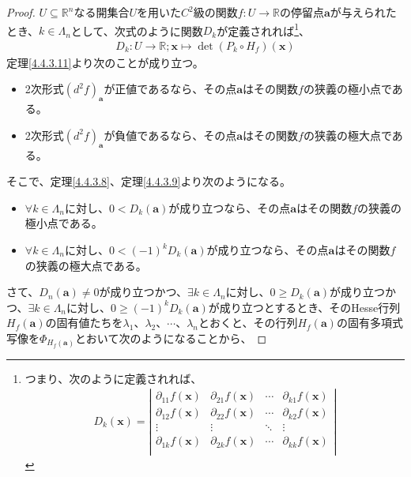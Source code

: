 \documentclass[dvipdfmx]{jsarticle}
\begin{document}
\begin{proof}
$U \subseteq \mathbb{R}^{n}$なる開集合$U$を用いた$C^{2}$級の関数$f:U \rightarrow \mathbb{R}$の停留点$\mathbf{a}$が与えられたとき、$k \in \varLambda_{n}$として、次式のように関数$D_{k}$が定義されれば\footnote{つまり、次のように定義されれば、
\begin{align*}
D_{k}\left( \mathbf{x} \right) = \left| \begin{matrix}
  \partial_{11}f\left( \mathbf{x} \right) & \partial_{21}f\left( \mathbf{x} \right) & \cdots & \partial_{k1}f\left( \mathbf{x} \right) \\
  \partial_{12}f\left( \mathbf{x} \right) & \partial_{22}f\left( \mathbf{x} \right) & \cdots & \partial_{k2}f\left( \mathbf{x} \right) \\
   \vdots & \vdots & \ddots & \vdots \\
  \partial_{1k}f\left( \mathbf{x} \right) & \partial_{2k}f\left( \mathbf{x} \right) & \cdots & \partial_{kk}f\left( \mathbf{x} \right) \\
\end{matrix} \right|
\end{align*}}、
\begin{align*}
D_{k}:U \rightarrow \mathbb{R};\mathbf{x} \mapsto \det{\left( P_{k} \circ H_{f} \right)\left( \mathbf{x} \right)} 
\end{align*}
定理\ref{4.4.3.11}より次のことが成り立つ。
\begin{itemize}
\item
  2次形式$\left( d^{2}f \right)_{\mathbf{a}}$が正値であるなら、その点$\mathbf{a}$はその関数$f$の狭義の極小点である。
\item
  2次形式$\left( d^{2}f \right)_{\mathbf{a}}$が負値であるなら、その点$\mathbf{a}$はその関数$f$の狭義の極大点である。
\end{itemize}
そこで、定理\ref{4.4.3.8}、定理\ref{4.4.3.9}より次のようになる。
\begin{itemize}
\item
  $\forall k \in \varLambda_{n}$に対し、$0 < D_{k}\left( \mathbf{a} \right)$が成り立つなら、その点$\mathbf{a}$はその関数$f$の狭義の極小点である。
\item
  $\forall k \in \varLambda_{n}$に対し、$0 < ( - 1)^{k}D_{k}\left( \mathbf{a} \right)$が成り立つなら、その点$\mathbf{a}$はその関数$f$の狭義の極大点である。
\end{itemize}
さて、$D_{n}\left( \mathbf{a} \right) \neq 0$が成り立つかつ、$\exists k \in \varLambda_{n}$に対し、$0 \geq D_{k}\left( \mathbf{a} \right)$が成り立つかつ、$\exists k \in \varLambda_{n}$に対し、$0 \geq ( - 1)^{k}D_{k}\left( \mathbf{a} \right)$が成り立つとするとき、そのHesse行列$H_{f}\left( \mathbf{a} \right)$の固有値たちを$\lambda_{1}$、$\lambda_{2}$、$\cdots$、$\lambda_{n}$とおくと、その行列$H_{f}\left( \mathbf{a} \right)$の固有多項式写像を$\varPhi_{H_{f}\left( \mathbf{a} \right)}$とおいて次のようになることから、

\end{proof}
\end{document}
